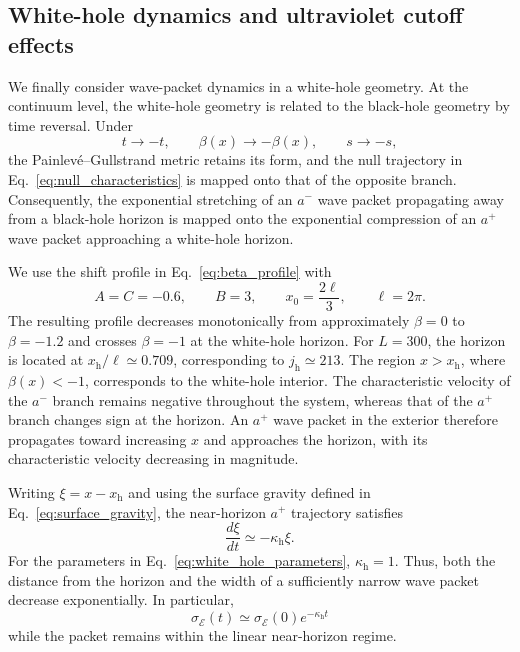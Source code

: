 \documentclass[reprint,amsmath,amssymb,aps,prb,showkeys,superscriptaddress]{revtex4-2}
\begin{document}
\subsection{White-hole dynamics and ultraviolet cutoff effects}
\label{subsec:white_hole}

We finally consider wave-packet dynamics in a white-hole geometry.
At the continuum level, the white-hole geometry is related to the
black-hole geometry by time reversal. Under
\begin{equation}
  t\rightarrow -t,
  \qquad
  \beta(x)\rightarrow-\beta(x),
  \qquad
  s\rightarrow-s,
  \label{eq:bh_wh_time_reversal}
\end{equation}
the Painlev\'e--Gullstrand metric retains its form, and the null
trajectory in Eq.~\eqref{eq:null_characteristics} is mapped onto
that of the opposite branch. Consequently, the exponential
stretching of an $a^-$ wave packet propagating away from a
black-hole horizon is mapped onto the exponential compression of an
$a^+$ wave packet approaching a white-hole horizon.

We use the shift profile in Eq.~\eqref{eq:beta_profile} with
\begin{equation}
  A=C=-0.6,
  \qquad
  B=3,
  \qquad
  x_0=\frac{2\ell}{3},
  \qquad
  \ell=2\pi.
  \label{eq:white_hole_parameters}
\end{equation}
The resulting profile decreases monotonically from approximately
$\beta=0$ to $\beta=-1.2$ and crosses $\beta=-1$ at the
white-hole horizon. For $L=300$, the horizon is located at
$x_{\mathrm h}/\ell\simeq0.709$, corresponding to
$j_{\mathrm h}\simeq213$. The region $x>x_{\mathrm h}$, where
$\beta(x)<-1$, corresponds to the white-hole interior. The
characteristic velocity of the $a^-$ branch remains negative
throughout the system, whereas that of the $a^+$ branch changes
sign at the horizon. An $a^+$ wave packet in the exterior therefore
propagates toward increasing $x$ and approaches the horizon, with
its characteristic velocity decreasing in magnitude.

Writing $\xi=x-x_{\mathrm h}$ and using the surface gravity defined
in Eq.~\eqref{eq:surface_gravity}, the near-horizon $a^+$
trajectory satisfies
\begin{equation}
  \frac{d\xi}{dt}
  \simeq
  -\kappa_{\mathrm h}\xi.
  \label{eq:white_hole_near_horizon}
\end{equation}
For the parameters in Eq.~\eqref{eq:white_hole_parameters},
$\kappa_{\mathrm h}=1$. Thus, both the distance from the horizon
and the width of a sufficiently narrow wave packet decrease
exponentially. In particular,
\begin{equation}
  \sigma_{\mathcal E}(t)
  \simeq
  \sigma_{\mathcal E}(0)
  e^{-\kappa_{\mathrm h}t}
  \label{eq:white_hole_compression}
\end{equation}
while the packet remains within the linear near-horizon regime.
\end{document}
